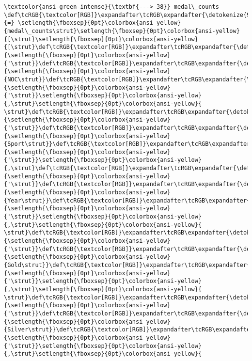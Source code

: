 \documentclass[11pt]{article}
\begin{document}
\begin{Verbatim}[commandchars=\\\{\}, frame=single, framerule=2mm, rulecolor=\color{outerrorbackground}]
\textcolor{ansi-green-intense}{\textbf{---> 38}} medal\_counts \def\tcRGB{\textcolor[RGB]}\expandafter\tcRGB\expandafter{\detokenize{98,98,98}}{=} \setlength{\fboxsep}{0pt}\colorbox{ansi-yellow}{medal\_counts\strut}\setlength{\fboxsep}{0pt}\colorbox{ansi-yellow}{[\strut}\setlength{\fboxsep}{0pt}\colorbox{ansi-yellow}{[\strut}\def\tcRGB{\textcolor[RGB]}\expandafter\tcRGB\expandafter{\detokenize{175,0,0}}{\setlength{\fboxsep}{0pt}\colorbox{ansi-yellow}{'\strut}}\def\tcRGB{\textcolor[RGB]}\expandafter\tcRGB\expandafter{\detokenize{175,0,0}}{\setlength{\fboxsep}{0pt}\colorbox{ansi-yellow}{NOC\strut}}\def\tcRGB{\textcolor[RGB]}\expandafter\tcRGB\expandafter{\detokenize{175,0,0}}{\setlength{\fboxsep}{0pt}\colorbox{ansi-yellow}{'\strut}}\setlength{\fboxsep}{0pt}\colorbox{ansi-yellow}{,\strut}\setlength{\fboxsep}{0pt}\colorbox{ansi-yellow}{ \strut}\def\tcRGB{\textcolor[RGB]}\expandafter\tcRGB\expandafter{\detokenize{175,0,0}}{\setlength{\fboxsep}{0pt}\colorbox{ansi-yellow}{'\strut}}\def\tcRGB{\textcolor[RGB]}\expandafter\tcRGB\expandafter{\detokenize{175,0,0}}{\setlength{\fboxsep}{0pt}\colorbox{ansi-yellow}{Sport\strut}}\def\tcRGB{\textcolor[RGB]}\expandafter\tcRGB\expandafter{\detokenize{175,0,0}}{\setlength{\fboxsep}{0pt}\colorbox{ansi-yellow}{'\strut}}\setlength{\fboxsep}{0pt}\colorbox{ansi-yellow}{,\strut}\def\tcRGB{\textcolor[RGB]}\expandafter\tcRGB\expandafter{\detokenize{175,0,0}}{\setlength{\fboxsep}{0pt}\colorbox{ansi-yellow}{'\strut}}\def\tcRGB{\textcolor[RGB]}\expandafter\tcRGB\expandafter{\detokenize{175,0,0}}{\setlength{\fboxsep}{0pt}\colorbox{ansi-yellow}{Year\strut}}\def\tcRGB{\textcolor[RGB]}\expandafter\tcRGB\expandafter{\detokenize{175,0,0}}{\setlength{\fboxsep}{0pt}\colorbox{ansi-yellow}{'\strut}}\setlength{\fboxsep}{0pt}\colorbox{ansi-yellow}{,\strut}\setlength{\fboxsep}{0pt}\colorbox{ansi-yellow}{ \strut}\def\tcRGB{\textcolor[RGB]}\expandafter\tcRGB\expandafter{\detokenize{175,0,0}}{\setlength{\fboxsep}{0pt}\colorbox{ansi-yellow}{'\strut}}\def\tcRGB{\textcolor[RGB]}\expandafter\tcRGB\expandafter{\detokenize{175,0,0}}{\setlength{\fboxsep}{0pt}\colorbox{ansi-yellow}{Gold\strut}}\def\tcRGB{\textcolor[RGB]}\expandafter\tcRGB\expandafter{\detokenize{175,0,0}}{\setlength{\fboxsep}{0pt}\colorbox{ansi-yellow}{'\strut}}\setlength{\fboxsep}{0pt}\colorbox{ansi-yellow}{,\strut}\setlength{\fboxsep}{0pt}\colorbox{ansi-yellow}{ \strut}\def\tcRGB{\textcolor[RGB]}\expandafter\tcRGB\expandafter{\detokenize{175,0,0}}{\setlength{\fboxsep}{0pt}\colorbox{ansi-yellow}{'\strut}}\def\tcRGB{\textcolor[RGB]}\expandafter\tcRGB\expandafter{\detokenize{175,0,0}}{\setlength{\fboxsep}{0pt}\colorbox{ansi-yellow}{Silver\strut}}\def\tcRGB{\textcolor[RGB]}\expandafter\tcRGB\expandafter{\detokenize{175,0,0}}{\setlength{\fboxsep}{0pt}\colorbox{ansi-yellow}{'\strut}}\setlength{\fboxsep}{0pt}\colorbox{ansi-yellow}{,\strut}\setlength{\fboxsep}{0pt}\colorbox{ansi-yellow}{ 
\end{Verbatim}
\end{document}
